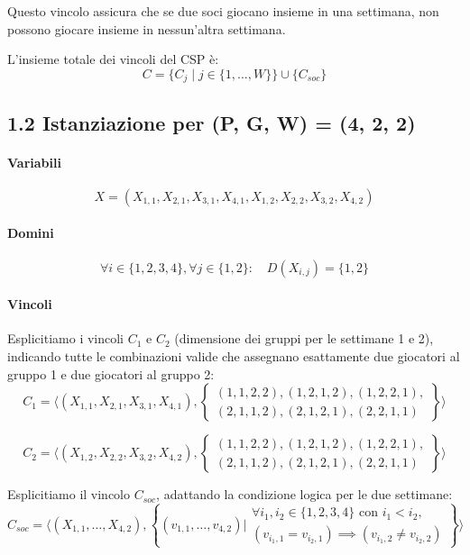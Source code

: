 \documentclass[a4paper,11pt]{article}
\begin{document}
Questo vincolo assicura che se due soci giocano insieme in una settimana, non possono giocare insieme in nessun'altra settimana.


L'insieme totale dei vincoli del CSP è:
\[
C = \{ C_j \mid j \in \{1, \dots, W\} \} \cup \{ C_{soc} \}
\]

\newpage

\subsection*{1.2 Istanziazione per (P, G, W) = (4, 2, 2)}

\paragraph{Variabili}
\[
X = (X_{1,1}, X_{2,1}, X_{3,1}, X_{4,1}, X_{1,2}, X_{2,2}, X_{3,2}, X_{4,2})
\]

\paragraph{Domini}
\[
\forall i \in \{1, 2, 3, 4\}, \forall j \in \{1, 2\}:\quad D(X_{i,j}) = \{1, 2\}
\]

\paragraph{Vincoli}

Esplicitiamo i vincoli $C_1$ e $C_2$ (dimensione dei gruppi per le settimane 1 e 2), indicando tutte le combinazioni valide che assegnano esattamente due giocatori al gruppo 1 e due giocatori al gruppo 2:
\[
C_1 = \langle (X_{1,1}, X_{2,1}, X_{3,1}, X_{4,1}), \left\{ 
\begin{array}{l}
(1, 1, 2, 2), (1, 2, 1, 2), (1, 2, 2, 1), \\
(2, 1, 1, 2), (2, 1, 2, 1), (2, 2, 1, 1)
\end{array}
\right\} \rangle
\]

\[
C_2 = \langle (X_{1,2}, X_{2,2}, X_{3,2}, X_{4,2}), \left\{ 
\begin{array}{l}
(1, 1, 2, 2), (1, 2, 1, 2), (1, 2, 2, 1), \\
(2, 1, 1, 2), (2, 1, 2, 1), (2, 2, 1, 1)
\end{array}
\right\} \rangle
\]

Esplicitiamo il vincolo  $C_{soc}$, adattando la condizione logica per le due settimane:
\[
C_{soc} = \langle (X_{1,1}, \ldots, X_{4,2}), \left\{ (v_{1,1}, \ldots, v_{4,2}) \mathrel{\Big|}
\begin{array}{l}
\forall i_1, i_2 \in \{1, 2, 3, 4\} \text{ con } i_1 < i_2, \\
(v_{i_1,1} = v_{i_2,1}) \implies (v_{i_1,2} \neq v_{i_2,2})
\end{array}
\right\} \rangle
\]
\newpage
\end{document}

